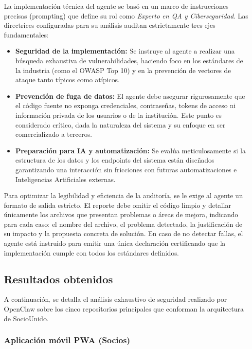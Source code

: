 La implementación técnica del agente se basó en un marco de instrucciones precisas (prompting) que define su rol como \textit{Experto en QA y Ciberseguridad}. Las directrices configuradas para su análisis auditan estrictamente tres ejes fundamentales:

\begin{itemize}
    \item \textbf{Seguridad de la implementación:} Se instruye al agente a realizar una búsqueda exhaustiva de vulnerabilidades, haciendo foco en los estándares de la industria (como el OWASP Top 10) y en la prevención de vectores de ataque tanto típicos como atípicos.
    \item \textbf{Prevención de fuga de datos:} El agente debe asegurar rigurosamente que el código fuente no exponga credenciales, contraseñas, tokens de acceso ni información privada de los usuarios o de la institución. Este punto es considerado crítico, dada la naturaleza del sistema y su enfoque en ser comercializado a terceros.
    \item \textbf{Preparación para IA y automatización:} Se evalúa meticulosamente si la estructura de los datos y los endpoints del sistema están diseñados garantizando una interacción sin fricciones con futuras automatizaciones e Inteligencias Artificiales externas.
\end{itemize}

Para optimizar la legibilidad y eficiencia de la auditoría, se le exige al agente un formato de salida estricto. El reporte debe omitir el código limpio y detallar únicamente los archivos que presentan problemas o áreas de mejora, indicando para cada caso: el nombre del archivo, el problema detectado, la justificación de su impacto y la propuesta concreta de solución. En caso de no detectar fallas, el agente está instruido para emitir una única declaración certificando que la implementación cumple con todos los estándares definidos.

\newpage

\subsection{Resultados obtenidos}

A continuación, se detalla el análisis exhaustivo de seguridad realizado por OpenClaw sobre los cinco repositorios principales que conforman la arquitectura de SocioUnido.

\subsubsection{Aplicación móvil PWA (Socios)}

